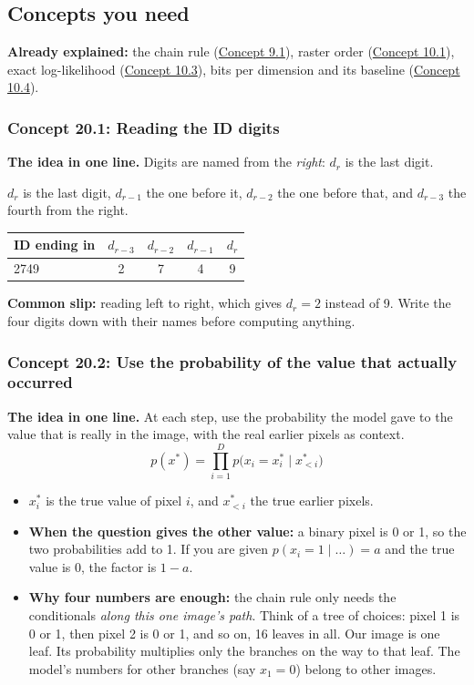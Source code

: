 \documentclass[12pt,a4paper]{article}
\begin{document}
\subsection{Concepts you need}

\textbf{Already explained:} the chain rule (\hyperref[c9-1]{Concept 9.1}), raster order (\hyperref[c10-1]{Concept 10.1}), exact log-likelihood (\hyperref[c10-3]{Concept 10.3}), bits per dimension and its baseline (\hyperref[c10-4]{Concept 10.4}).

\subsubsection{Concept 20.1: Reading the ID digits}\label{c20-1}

\textbf{The idea in one line.} Digits are named from the \emph{right}: $d_r$ is the last digit.

$d_r$ is the last digit, $d_{r-1}$ the one before it, $d_{r-2}$ the one before that, and $d_{r-3}$ the fourth from the right.
\begin{center}
\begin{tabular}{@{}lcccc@{}}
\toprule
ID ending in & $d_{r-3}$ & $d_{r-2}$ & $d_{r-1}$ & $d_r$ \\
\midrule
2749 & 2 & 7 & 4 & 9 \\
\bottomrule
\end{tabular}
\end{center}
\textbf{Common slip:} reading left to right, which gives $d_r=2$ instead of 9. Write the four digits down with their names before computing anything.

\subsubsection{Concept 20.2: Use the probability of the value that actually occurred}\label{c20-2}

\textbf{The idea in one line.} At each step, use the probability the model gave to the value that is really in the image, with the real earlier pixels as context.
\[
p(x^*)=\prod_{i=1}^{D}p\big(x_i=x_i^*\mid x_{<i}^*\big)
\]
\begin{itemize}[nosep]
  \item $x_i^*$ is the true value of pixel $i$, and $x_{<i}^*$ the true earlier pixels.
  \item \textbf{When the question gives the other value:} a binary pixel is 0 or 1, so the two probabilities add to 1. If you are given $p(x_i=1\mid\dots)=a$ and the true value is 0, the factor is $1-a$.
  \item \textbf{Why four numbers are enough:} the chain rule only needs the conditionals \emph{along this one image's path}. Think of a tree of choices: pixel 1 is 0 or 1, then pixel 2 is 0 or 1, and so on, 16 leaves in all. Our image is one leaf. Its probability multiplies only the branches on the way to that leaf. The model's numbers for other branches (say $x_1=0$) belong to other images.
\end{itemize}
\end{document}
